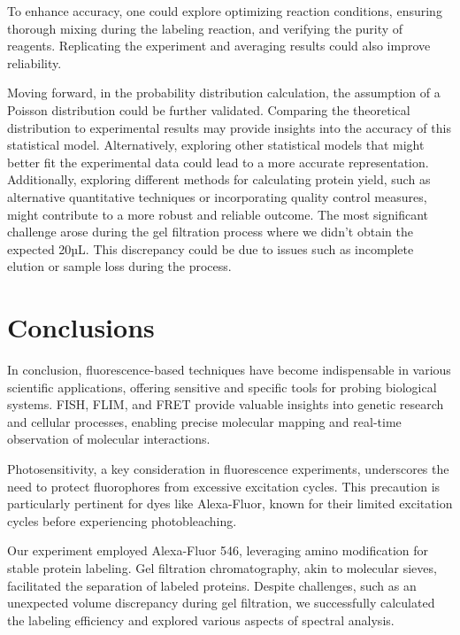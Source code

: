 \documentclass[a4paper,english,12pt,bibliography=totoc]{scrreprt}
\begin{document}
To enhance accuracy, one could explore optimizing reaction conditions, ensuring thorough mixing during the labeling reaction, and verifying the purity of reagents. Replicating the experiment and averaging results could also improve reliability.

Moving forward, in the probability distribution calculation, the assumption of a Poisson distribution could be further validated. Comparing the theoretical distribution to experimental results may provide insights into the accuracy of this statistical model. Alternatively, exploring other statistical models that might better fit the experimental data could lead to a more accurate representation.
Additionally, exploring different methods for calculating protein yield, such as alternative quantitative techniques or incorporating quality control measures, might contribute to a more robust and reliable outcome.
The most significant challenge arose during the gel filtration process where we didn't obtain the expected 20µL. This discrepancy could be due to issues such as incomplete elution or sample loss during the process. 





\chapter{Conclusions}
\label{cha:conclusions}

In conclusion, fluorescence-based techniques have become indispensable in various scientific applications, offering sensitive and specific tools for probing biological systems. FISH, FLIM, and FRET provide valuable insights into genetic research and cellular processes, enabling precise molecular mapping and real-time observation of molecular interactions.

Photosensitivity, a key consideration in fluorescence experiments, underscores the need to protect fluorophores from excessive excitation cycles. This precaution is particularly pertinent for dyes like Alexa-Fluor, known for their limited excitation cycles before experiencing photobleaching.

Our experiment employed Alexa-Fluor 546, leveraging amino modification for stable protein labeling. Gel filtration chromatography, akin to molecular sieves, facilitated the separation of labeled proteins. Despite challenges, such as an unexpected volume discrepancy during gel filtration, we successfully calculated the labeling efficiency and explored various aspects of spectral analysis.
\end{document}
